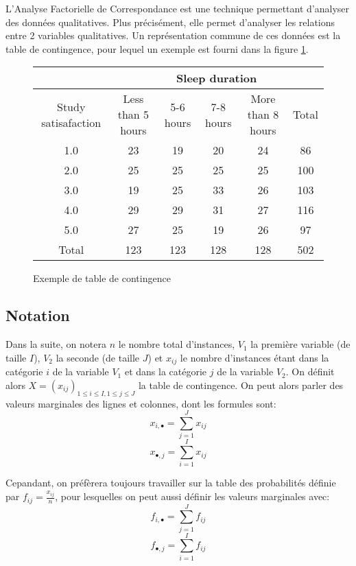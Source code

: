 L'Analyse Factorielle de Correspondance est une technique permettant d'analyser des données qualitatives. 
Plus précisément, elle permet d'analyser les relations entre 2 variables qualitatives. Un représentation commune de ces données est la table de contingence, pour lequel un exemple est fourni dans la figure \ref{cont-table}. 

\begin{figure}[!h]
\begin{center}
  \begin{tabular}{| c | c | c | c | c | c |}
    \hline
    & \multicolumn{5}{|c|}{Sleep duration}\\
    \hline
    Study satisafaction & Less than 5 hours & 5-6 hours & 7-8 hours & More than 8 hours & Total\\
    \hline
    1.0 & 23 & 19 & 20 & 24 & 86 \\ 
    \hline 
    2.0 & 25 & 25 & 25 & 25 & 100\\ 
    \hline 
    3.0 & 19 & 25 & 33 & 26 & 103\\ 
    \hline 
    4.0 & 29 & 29 & 31 & 27 & 116\\ 
    \hline 
    5.0 & 27 & 25 & 19 & 26 & 97\\ 
    \hline
    Total & 123 & 123 & 128 & 128 & 502 \\ 
    \hline

  \end{tabular}
\end{center}
  \caption{Exemple de table de contingence}
  \label{cont-table}
\end{figure}

\subsection{Notation}

Dans la suite, on notera $n$ le nombre total d'instances, $V_1$ la première variable (de taille $I$), $V_2$ la seconde (de taille $J$) et $x_{ij}$ le nombre d'instances étant dans la catégorie $i$ de la variable $V_1$ et dans la catégorie $j$ de la variable $V_2$.
On définit alors $X = (x_{ij})_{1 \leq i \leq I, 1 \leq j \leq J}$ la table de contingence. On peut alors parler des valeurs marginales des lignes et colonnes, dont les formules sont:
\[
  x_{i,\bullet} = \sum_{j=1}^J x_{ij} 
\]
\[
  x_{\bullet, j} = \sum_{i=1}^I x_{ij}
\]

Cepandant, on préfèrera toujours travailler sur la table des probabilités définie par $f_{ij} = \frac{x_{ij}}{n}$, pour lesquelles on peut aussi définir les valeurs marginales avec: 
\[
  f_{i,\bullet} = \sum_{j=1}^J f_{ij}
\]
\[
  f_{\bullet, j} = \sum_{i=1}^I f_{ij}
\]

